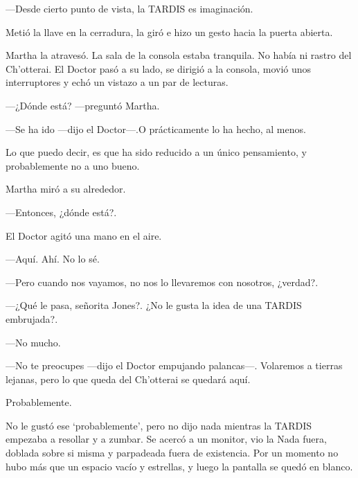 ---Desde cierto punto de vista, la TARDIS es imaginación.

Metió la llave en la cerradura, la giró e hizo un gesto hacia la puerta abierta.

Martha la atravesó. La sala de la consola estaba tranquila. No había ni rastro del Ch'otterai. El Doctor pasó a su lado, se dirigió a la consola, movió unos interruptores y echó un vistazo a un par de lecturas.

---¿Dónde está? ---preguntó Martha.

---Se ha ido ---dijo el Doctor---.O prácticamente lo ha hecho, al menos.

Lo que puedo decir, es que ha sido reducido a un único pensamiento, y probablemente no a uno bueno.

Martha miró a su alrededor.

---Entonces, ¿dónde está?.

El Doctor agitó una mano en el aire.

---Aquí. Ahí. No lo sé.

---Pero cuando nos vayamos, no nos lo llevaremos con nosotros, ¿verdad?.

---¿Qué le pasa, señorita Jones?. ¿No le gusta la idea de una TARDIS embrujada?.

---No mucho.

---No te preocupes ---dijo el Doctor empujando palancas---. Volaremos a tierras lejanas, pero lo que queda del Ch'otterai se quedará aquí.

Probablemente.

No le gustó ese `probablemente', pero no dijo nada mientras la TARDIS empezaba a resollar y a zumbar. Se acercó a un monitor, vio la Nada fuera, doblada sobre si misma y parpadeada fuera de existencia. Por un momento no hubo más que un espacio vacío y estrellas, y luego la pantalla se quedó en blanco.

